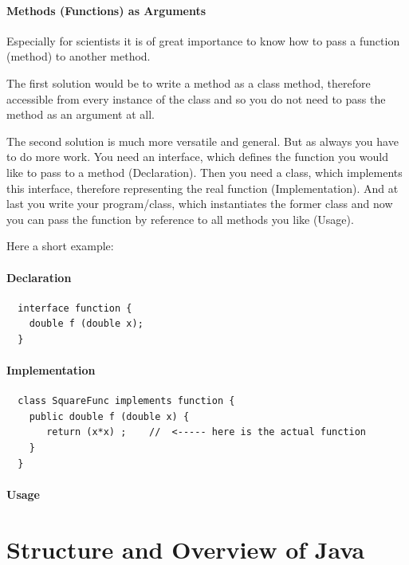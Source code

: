\paragraph{Methods (Functions) as Arguments} 
Especially for scientists it is of great importance to know how
to pass a function (method) to another method.

The first solution would be to write a method as a class method,
therefore accessible from every instance of the class and
so you do not need to pass the method as an argument at all.

The second solution is much more versatile and general.
But as always you have to do more work. You need an interface,
which defines the function you would like to pass to a method
(Declaration). Then you need a class, which implements this
interface, therefore representing the real function (Implementation).
And at last you write your program/class, which instantiates
the former class and now you can pass the function by reference
to all methods you like (Usage).  

Here a short example:
\paragraph{Declaration} 
\begin{verbatim}
  interface function {
    double f (double x); 
  }
\end{verbatim}

\paragraph{Implementation}
\begin{verbatim}
  class SquareFunc implements function {
    public double f (double x) {
       return (x*x) ;    //  <----- here is the actual function
    }
  }
\end{verbatim}

\paragraph{Usage}

\section{Structure and Overview of Java}

